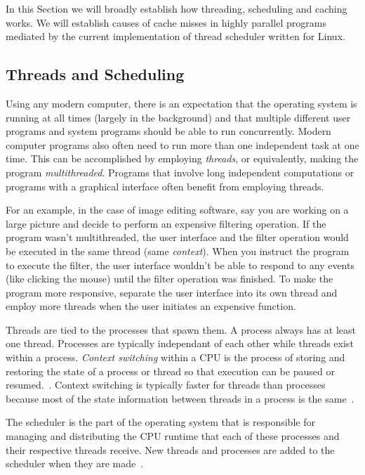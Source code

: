 \documentclass{sig-alternate}
\begin{document}
In this Section we will broadly establish how threading, scheduling and caching works. We will establish causes of cache misses in highly parallel programs mediated by the current implementation of thread scheduler written for Linux.

\subsection{Threads and Scheduling}
\label{sec:threads}
Using any modern computer, there is an expectation that the operating system is running at all times (largely in the background) and that multiple different user programs and system programs should be able to run concurrently. Modern computer programs also often need to run more than one independent task at one time. This can be accomplished by employing \emph{threads}, or equivalently, making the program \emph{multithreaded}. Programs that involve long independent computations or programs with a graphical interface often benefit from employing threads.

For an example, in the case of image editing software, say you are working on a large picture and decide to perform an expensive filtering operation. If the program wasn't multithreaded, the user interface and the filter operation would be executed in the same thread (same \emph{context}). When you instruct the program to execute the filter, the user interface wouldn't be able to respond to any events (like clicking the mouse) until the filter operation was finished. To make the program more responsive, separate the user interface into its own thread and employ more threads when the user initiates an expensive function.
	
Threads are tied to the processes that spawn them. A process always has at least one thread. Processes are typically independant of each other while threads exist within a process. \emph{Context switching} within a CPU is the process of storing and restoring the state of a process or thread so that execution can be paused or resumed.~\cite{WikiContext}. Context switching is typically faster for threads than processes because most of the state information between threads in a process is the same~\cite{WikiThreads}. 

The scheduler is the part of the operating system that is responsible for managing and distributing the CPU runtime that each of these processes and their respective threads receive. New threads and processes are added to the scheduler when they are made~\cite{Lozi:2016}.
\end{document}
